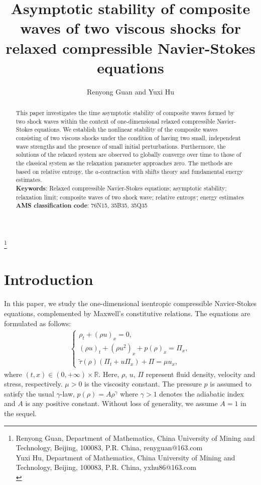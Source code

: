 \documentclass[10pt,reqno]{amsart}
\numberwithin{equation}{section}
\begin{document}
\title[Stability for relaxed CNS]{Asymptotic stability of composite waves of two viscous shocks for relaxed compressible Navier-Stokes equations}
\author{Renyong Guan and Yuxi Hu}
 \thanks{\noindent  Renyong Guan,   Department of Mathematics, China University of Mining and Technology, Beijing, 100083, P.R. China, renyguan@163.com\\
\indent  Yuxi Hu, Department of Mathematics, China University of Mining and Technology, Beijing, 100083, P.R. China, yxhu86@163.com\\
 }
\begin{abstract}
This paper investigates the time asymptotic stability of composite waves formed by two shock waves within the context of one-dimensional relaxed compressible Navier-Stokes equations. We establish the nonlinear stability  of the composite waves consisting of two viscous shocks  under the condition of having two small, independent wave strengths and the presence of small initial perturbations. Furthermore, the solutions of the relaxed system are observed to globally converge over time to those of the classical system as the relaxation parameter approaches zero. The methods are based on relative entropy, the $a$-contraction with shifts theory and fundamental energy estimates.
 \\[2em]
{\bf Keywords}: Relaxed compressible Navier-Stokes equations; asymptotic stability; relaxation limit; composite waves of two shock wave; relative entropy; energy estimates \\
{\bf AMS classification code}: 76N15, 35B35, 35Q35

\end{abstract}
\maketitle
\section{Introduction}
In this paper, we study the one-dimensional isentropic compressible Navier-Stokes equations, complemented by Maxwell's constitutive relations. The equations are formulated as follows:
\begin{align}\label{1.1}
\begin{cases}
\rho_t+(\rho u)_x=0,\\
(\rho u)_t+(\rho u^2)_x+p(\rho)_x=\Pi_x,\\
\tilde \tau  (\rho) (\Pi_t+ u \Pi_x)+\Pi=\mu u_x,
\end{cases}
\end{align}
where $(t, x)\in (0, +\infty)\times \mathbb R$. Here, $\rho$, $u$, $\Pi$ represent fluid density, velocity and stress, respectively. $\mu>0$ is the viscosity constant.
The pressure $p$ is assumed to satisfy the usual $\gamma$-law, $p(\rho)=A \rho^\gamma$ where $\gamma>1$ denotes the adiabatic index and $A$ is any positive constant.
Without loss of generality, we assume %
$A=1$ in the sequel.
\end{document}
